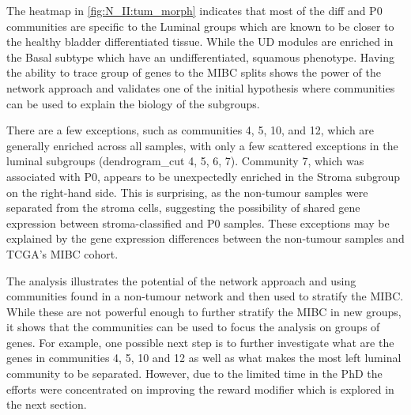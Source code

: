 The heatmap in \cref{fig:N_II:tum_morph} indicates that most of the diff and P0 communities are specific to the Luminal groups which are known to be closer to the healthy bladder differentiated tissue. While the UD modules are enriched in the Basal subtype which have an undifferentiated, squamous phenotype. Having the ability to trace group of genes to the MIBC splits shows the power of the network approach and validates one of the initial hypothesis where communities can be used to explain the biology of the subgroups.

There are a few exceptions, such as communities 4, 5, 10, and 12, which are generally enriched across all samples, with only a few scattered exceptions in the luminal subgroups (dendrogram\_cut 4, 5, 6, 7). Community 7, which was associated with P0, appears to be unexpectedly enriched in the Stroma subgroup on the right-hand side. This is surprising, as the non-tumour samples were separated from the stroma cells, suggesting the possibility of shared gene expression between stroma-classified and P0 samples. These exceptions may be explained by the gene expression differences between the non-tumour samples and TCGA's MIBC cohort.

The analysis illustrates the potential of the network approach and using communities found in a non-tumour network and then used to stratify the MIBC. While these are not powerful enough to further stratify the MIBC in new groups, it shows that the communities can be used to focus the analysis on groups of genes. For example, one possible next step is to further investigate what are the genes in communities 4, 5, 10 and 12 as well as what makes the most left luminal community to be separated. However, due to the limited time in the PhD the efforts were concentrated on improving the reward modifier which is explored in the next section.

